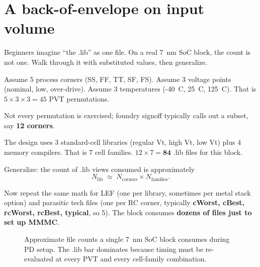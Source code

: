 \section{A back-of-envelope on input volume}

Beginners imagine ``the .lib'' as one file. On a real 7~nm SoC block, the count is not one. Walk through it with substituted values, then generalize.

 Assume 5 process corners (SS, FF, TT, SF, FS). Assume 3 voltage points (nominal, low, over-drive). Assume 3 temperatures (-40~C, 25~C, 125~C). That is $5 \times 3 \times 3 = 45$ PVT permutations.

 Not every permutation is exercised; foundry signoff typically calls out a subset, say \textbf{12 corners}.

 The design uses 3 standard-cell libraries (regular Vt, high Vt, low Vt) plus 4 memory compilers. That is 7 cell families. $12 \times 7 = \mathbf{84}$ .lib files for this block.

 Generalize: the count of .lib views consumed is approximately
\[
N_{\mathrm{lib}} \;\approx\; N_{\mathrm{corners}} \times N_{\mathrm{families}}.
\]

 Now repeat the same math for LEF (one per library, sometimes per metal stack option) and parasitic tech files (one per RC corner, typically \textbf{cWorst, cBest, rcWorst, rcBest, typical}, so 5). The block consumes \textbf{dozens of files just to set up MMMC}.

\begin{figure}[h]
\centering
{}
\caption{Approximate file counts a single 7~nm SoC block consumes during PD setup. The .lib bar dominates because timing must be re-evaluated at every PVT and every cell-family combination.}
\label{fig:file-count}
\end{figure}

